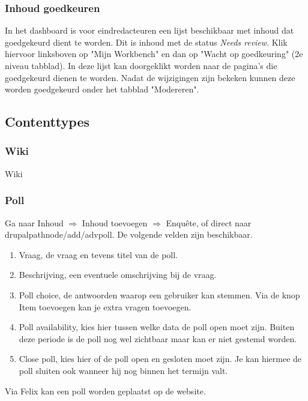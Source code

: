 \subsubsection{Inhoud goedkeuren}

In het dashboard is voor eindredacteuren een lijst beschikbaar met inhoud dat goedgekeurd dient te worden. Dit is inhoud met de status \emph{Needs review}. Klik hiervoor linksboven op "Mijn Workbench" en dan op "Wacht op goedkeuring" (2e niveau tabblad). In deze lijst kan doorgeklikt worden naar de pagina's die goedgekeurd dienen te worden. Nadat de wijzigingen zijn bekeken kunnen deze worden goedgekeurd onder het tabblad "Modereren".


\subsection{Contenttypes}

\subsubsection{Wiki}

Wiki

\subsubsection{Poll}
Ga naar Inhoud $\Rightarrow$ Inhoud toevoegen $\Rightarrow$ Enqu\^{e}te, of direct naar drupalpath{node/add/advpoll}. De volgende velden zijn beschikbaar.
\begin{enumerate}
\item Vraag, de vraag en tevens titel van de poll.
\item Beschrijving, een eventuele omschrijving bij de vraag.
\item Poll choice, de antwoorden waarop een gebruiker kan stemmen. Via de knop Item toevoegen kan je extra vragen toevoegen.
\item Poll availability, kies hier tussen welke data de poll open moet zijn. Buiten deze periode is de poll nog wel zichtbaar maar kan er niet gestemd worden.
\item Close poll, kies hier of de poll open en gesloten moet zijn. Je kan hiermee de poll sluiten ook wanneer hij nog binnen het termijn valt.
\end{enumerate}

Via Felix kan een poll worden geplaatst op de website.


